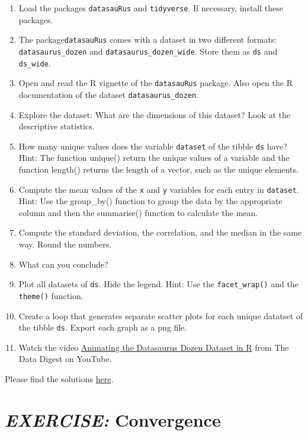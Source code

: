 \documentclass[
  12pt,
  oneside]{book}
\begin{document}
\begin{enumerate}
\def\labelenumi{\alph{enumi})}
\item
  Load the packages \texttt{datasauRus} and \texttt{tidyverse}. If necessary, install these packages.
\item
  The package\texttt{datasauRus} comes with a dataset in two different formats: \texttt{datasaurus\_dozen} and \texttt{datasaurus\_dozen\_wide}. Store them as \texttt{ds} and \texttt{ds\_wide}.
\item
  Open and read the R vignette of the \texttt{datasauRus} package. Also open the R documentation of the dataset \texttt{datasaurus\_dozen}.
\item
  Explore the dataset: What are the dimensions of this dataset? Look at the descriptive statistics.
\item
  How many unique values does the variable \texttt{dataset} of the tibble \texttt{ds} have? Hint: The function unique() return the unique values of a variable and the function length() returns the length of a vector, such as the unique elements.
\item
  Compute the mean values of the \texttt{x} and \texttt{y} variables for each entry in \texttt{dataset}. Hint: Use the group\_by() function to group the data by the appropriate column and then the summarise() function to calculate the mean.
\item
  Compute the standard deviation, the correlation, and the median in the same way. Round the numbers.
\item
  What can you conclude?
\item
  Plot all datasets of \texttt{ds}. Hide the legend. Hint: Use the \texttt{facet\_wrap()} and the \texttt{theme()} function.
\item
  Create a loop that generates separate scatter plots for each unique datatset of the tibble \texttt{ds}. Export each graph as a png file.
\item
  Watch the video \href{https://youtu.be/T-kxUB29t0o}{Animating the Datasaurus Dozen Dataset in R} from The Data Digest on YouTube.
\end{enumerate}

Please find the solutions \href{https://htmlpreview.github.io/?https://raw.githubusercontent.com/hubchev/hubchev.github.io/main/various/datasaurus_solution.html}{here}.

\hypertarget{exercise-convergence}{%
\section*{\texorpdfstring{\emph{EXERCISE:} Convergence}{EXERCISE: Convergence}}\label{exercise-convergence}}
\end{document}

